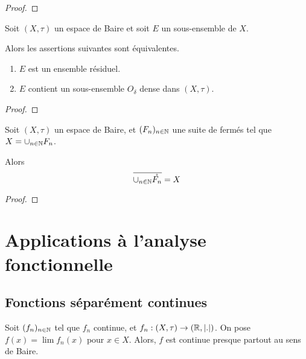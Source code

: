 \ifdefined\outputproof
\begin{proof}

\end{proof}
\fi

\begin{proposition}
	Soit $(X, \tau)$ un espace de Baire et soit $E$ un sous-ensemble de $X$.

	Alors les assertions suivantes sont équivalentes.
	\begin{enumerate}
		\item $E$ est un ensemble résiduel.
		\item $E$ contient un sous-ensemble $O_{\delta}$ dense dans $(X, \tau)$.
	\end{enumerate}
\end{proposition}

\ifdefined\outputproof
\begin{proof}

\end{proof}
\fi

 \begin{proposition}
	Soit $(X, \tau)$ un espace de Baire, et $(F_{n})_{n \in \mathbb{N}}$ une
	suite de fermés tel que $X = \displaystyle\cup_{n \in \mathbb{N}}F_{n}$.

	Alors
	\begin{equation}
		\displaystyle \overline{\cup_{n \in \mathbb{N}}\mathring{F_{n}}} = X
	\end{equation}
\end{proposition}

\ifdefined\outputproof
\begin{proof}

\end{proof}
\fi

\section{Applications à l'analyse fonctionnelle}

\subsection{Fonctions séparément continues}

\begin{theorem}
	\label{first_category_set_theorem_continued_function}
	Soit $(f_{n})_{n \in \mathbb{N}}$ tel que $f_{n}$ continue, et $f_{n} :
	(X, \tau) \rightarrow (\mathbb{R}, |.|)$.
	On pose $f(x) = \lim f_{n}(x)$ pour $x \in X$. Alors, $f$ est continue
	presque partout au sens de Baire.
\end{theorem}


